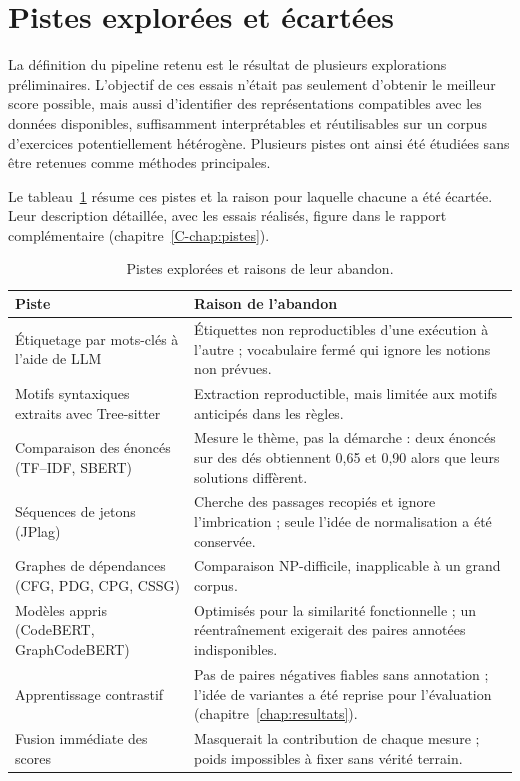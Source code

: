 \documentclass[12pt,a4paper,oneside]{report}
\begin{document}
\section{Pistes explorées et écartées}
\label{sec:pistes}

La définition du pipeline retenu est le résultat de plusieurs explorations
préliminaires. L'objectif de ces essais n'était pas seulement d'obtenir le
meilleur score possible, mais aussi d'identifier des représentations
compatibles avec les données disponibles, suffisamment interprétables et
réutilisables sur un corpus d'exercices potentiellement hétérogène. Plusieurs
pistes ont ainsi été étudiées sans être retenues comme méthodes principales.

Le tableau~\ref{tab:pistes} résume ces pistes et la raison pour laquelle
chacune a été écartée. Leur description détaillée, avec les essais
réalisés, figure dans le rapport complémentaire
(chapitre~\ref{C-chap:pistes}).

\begin{table}[htbp]
\centering
\small
\renewcommand{\arraystretch}{1.2}
\begin{tabularx}{\textwidth}{>{\raggedright\arraybackslash}p{4.6cm}X}
\toprule
\textbf{Piste} & \textbf{Raison de l'abandon} \\
\midrule
Étiquetage par mots-clés à l'aide de LLM \cite{ziani_detection_2025} &
  Étiquettes non reproductibles d'une exécution à l'autre ; vocabulaire
  fermé qui ignore les notions non prévues. \\
Motifs syntaxiques extraits avec Tree-sitter &
  Extraction reproductible, mais limitée aux motifs anticipés dans les
  règles. \\
Comparaison des énoncés (TF--IDF, SBERT) &
  Mesure le thème, pas la démarche : deux énoncés sur des dés obtiennent
  0,65 et 0,90 alors que leurs solutions diffèrent. \\
Séquences de jetons (JPlag) \cite{prechelt_finding_nodate} &
  Cherche des passages recopiés et ignore l'imbrication ; seule l'idée de
  normalisation a été conservée. \\
Graphes de dépendances (CFG, PDG, CPG, CSSG) &
  Comparaison NP-difficile, inapplicable à un grand corpus. \\
Modèles appris (CodeBERT, GraphCodeBERT) &
  Optimisés pour la similarité fonctionnelle ; un réentraînement exigerait
  des paires annotées indisponibles. \\
Apprentissage contrastif \cite{mu_2023} &
  Pas de paires négatives fiables sans annotation ; l'idée de variantes a
  été reprise pour l'évaluation (chapitre~\ref{chap:resultats}). \\
Fusion immédiate des scores &
  Masquerait la contribution de chaque mesure ; poids impossibles à fixer
  sans vérité terrain. \\
\bottomrule
\end{tabularx}
\caption{Pistes explorées et raisons de leur abandon.}
\label{tab:pistes}
\end{table}
\end{document}
